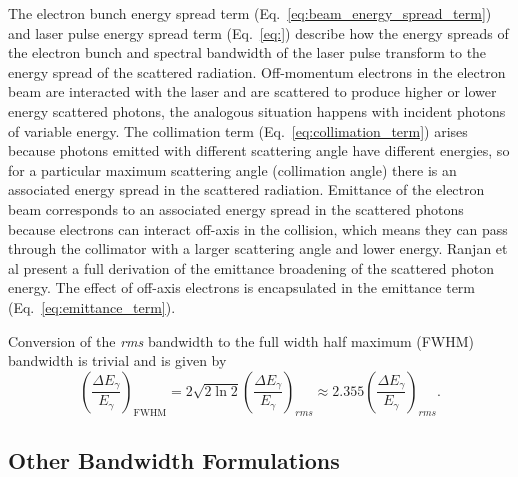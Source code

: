 \documentclass[../main.tex]{subfiles}
\begin{document}
The electron bunch energy spread term (Eq.~\ref{eq:beam_energy_spread_term}) and laser pulse energy spread term (Eq.~\ref{eq:}) describe how the energy spreads of the electron bunch and spectral bandwidth of the laser pulse transform to the energy spread of the scattered radiation. Off-momentum electrons in the electron beam are interacted with the laser and are scattered to produce higher or lower energy scattered photons, the analogous situation happens with incident photons of variable energy. The collimation term (Eq.~\ref{eq:collimation_term}) arises because photons emitted with different scattering angle have different energies, so for a particular maximum scattering angle (collimation angle) there is an associated energy spread in the scattered radiation. Emittance of the electron beam corresponds to an associated energy spread in the scattered photons because electrons can interact off-axis in the collision, which means they can pass through the collimator with a larger scattering angle and lower energy. Ranjan et al \cite{ranjan2018simulation} present a full derivation of the emittance broadening of the scattered photon energy.  The effect of off-axis electrons is encapsulated in the emittance term (Eq.~\ref{eq:emittance_term}). 

Conversion of the \textit{rms} bandwidth to the full width half maximum (FWHM) bandwidth is trivial and is given by 
\begin{equation}
\left(\frac{\Delta E_{\gamma}}{E_{\gamma}}\right)_{\mathrm{FWHM}} = 2\sqrt{2\ln{2}}\left(\frac{\Delta E_{\gamma}}{E_{\gamma}}\right)_{rms} \approx 2.355\left(\frac{\Delta E_{\gamma}}{E_{\gamma}}\right)_{rms}.
\label{eq:FWHM_bandwidth}
\end{equation}

\subsection{Other Bandwidth Formulations}
\end{document}
